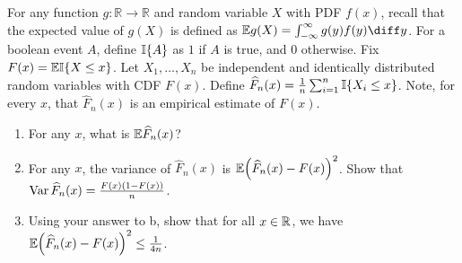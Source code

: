 \documentclass{article}
\begin{document}
\begin{problem}

For any function $g \colon \mathbb{R} \to \mathbb{R}$ and random variable $X$ with PDF $f(x)$, recall that the expected value of $g(X)$ is defined as $\mathbb{E}{g(X)} = \int_{-\infty}^\infty g(y) f(y) \diff y$. For a boolean event $A$, define $\mathbb{I}\{ A \}$ as $1$ if $A$ is true, and $0$ otherwise. Fix $F(x) = \mathbb{E}{\mathbb{I}\{X \leq x\}}$. Let $X_1,\ldots,X_n$ be independent and identically distributed random variables with CDF $F(x)$. Define $\widehat{F}_n(x) = \frac{1}{n} \sum_{i=1}^n \mathbb{I}\{X_i \leq x\}$. Note, for every $x$, that $\widehat{F}_n(x)$ is an empirical estimate of  $F(x)$.
    \begin{enumerate}
      \item For any $x$, what is $\mathbb{E}{\widehat{F}_n(x)}$?
      \item For any $x$, the variance of $\widehat{F}_n(x)$ is $\mathbb{E}{\left( \widehat{F}_n(x) -  F(x) \right)^2 }$.  Show that $\operatorname{Var}{\widehat{F}_n(x)} = \frac{F(x)(1-F(x))}{n}$.
      \item Using your answer to b, show that for all $x\in \mathbb{R}$, we have  $\displaystyle \mathbb{E}{ \left( \widehat{F}_n(x) - F(x) \right)^2 } \leq \tfrac{1}{4n}$.  
    \end{enumerate}
    
\end{problem}
\end{document}
